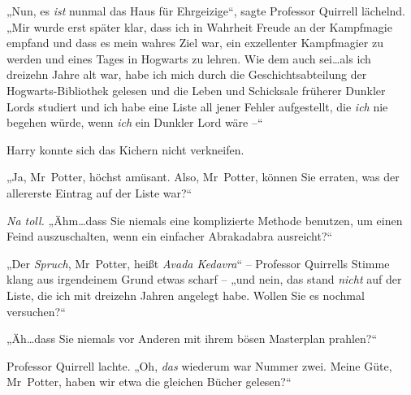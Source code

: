 „Nun, es \emph{ist} nunmal das Haus für Ehrgeizige“, sagte Professor Quirrell lächelnd. „Mir wurde erst später klar, dass ich in Wahrheit Freude an der Kampfmagie empfand und dass es mein wahres Ziel war, ein exzellenter Kampfmagier zu werden und eines Tages in Hogwarts zu lehren. Wie dem auch sei…als ich dreizehn Jahre alt war, habe ich mich durch die Geschichtsabteilung der Hogwarts-Bibliothek gelesen und die Leben und Schicksale früherer Dunkler Lords studiert und ich habe eine Liste all jener Fehler aufgestellt, die \emph{ich} nie begehen würde, wenn \emph{ich} ein Dunkler Lord wäre –“

Harry konnte sich das Kichern nicht verkneifen.

„Ja, Mr~Potter, höchst amüsant. Also, Mr~Potter, können Sie erraten, was der allererste Eintrag auf der Liste war?“

\emph{Na toll.} „Ähm…dass Sie niemals eine komplizierte Methode benutzen, um einen Feind auszuschalten, wenn ein einfacher Abrakadabra ausreicht?“

„Der \emph{Spruch}, Mr~Potter, heißt \emph{Avada Kedavra}“ – Professor Quirrells Stimme klang aus irgendeinem Grund etwas scharf – „und nein, das stand \emph{nicht} auf der Liste, die ich mit dreizehn Jahren angelegt habe. Wollen Sie es nochmal versuchen?“

„Äh…dass Sie niemals vor Anderen mit ihrem bösen Masterplan prahlen?“

Professor Quirrell lachte. „Oh, \emph{das} wiederum war Nummer zwei. Meine Güte, Mr~Potter, haben wir etwa die gleichen Bücher gelesen?“

